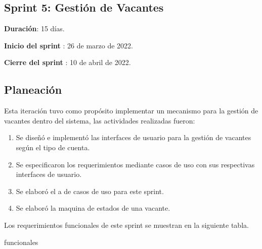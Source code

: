 \subsection{Sprint 5: Gestión de Vacantes}
\begin{description}
    \item \textbf{Duración}: 15 días.
    \item \textbf{Inicio del sprint }: 26 de marzo de 2022.
    \item \textbf{Cierre del sprint }: 10 de abril de 2022.
\end{description}

\subsection{Planeación}

Esta iteración tuvo como propósito implementar un mecanismo para la gestión de vacantes dentro del sistema, las actividades 
realizadas fueron:
\begin{enumerate}
    \item Se diseñó e implementó las interfaces de usuario para la gestión de vacantes según el tipo de cuenta.
    \item Se especificaron los requerimientos mediante casos de uso con sus respectivas interfaces de usuario.
    \item Se elaboró el a de casos de uso para este sprint.
    \item Se elaboró la maquina de estados de una vacante.
\end{enumerate} 

Los requerimientos funcionales de este sprint se muestran en la siguiente tabla.
\begin{requerimientos}{funcionales}
\end{requerimientos}

